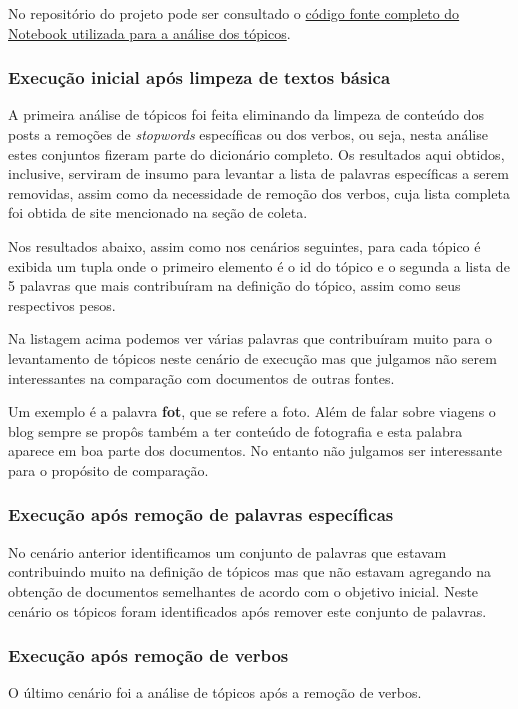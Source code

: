 No repositório do projeto pode ser consultado o \href{https://github.com/heldergr/tcc-pucmg-2/blob/main/src/python/notebooks/nerds-viajantes-lda-analise-topicos.ipynb}{código fonte completo do Notebook utilizada para a análise dos tópicos}.

\subsubsection{Execução inicial após limpeza de textos básica}

A primeira análise de tópicos foi feita eliminando da limpeza de conteúdo dos posts a remoções de \textit{stopwords} específicas ou dos verbos, ou seja,
nesta análise estes conjuntos fizeram parte do dicionário completo. Os resultados aqui obtidos, inclusive, serviram de insumo para levantar a lista
de palavras específicas a serem removidas, assim como da necessidade de remoção dos verbos, cuja lista completa foi obtida de site mencionado na seção de coleta.

Nos resultados abaixo, assim como nos cenários seguintes, para cada tópico é exibida um tupla onde o primeiro elemento é o id do tópico
e o segunda a lista de 5 palavras que mais contribuíram na definição do tópico, assim como seus respectivos pesos.



Na listagem acima podemos ver várias palavras que contribuíram muito para o levantamento de tópicos neste cenário de execução mas que julgamos não serem
interessantes na comparação com documentos de outras fontes.

Um exemplo é a palavra \textbf{fot}, que se refere a foto. Além de falar sobre viagens o blog sempre se propôs também a ter conteúdo de fotografia e esta
palabra aparece em boa parte dos documentos. No entanto não julgamos ser interessante para o propósito de comparação.

\subsubsection{Execução após remoção de palavras específicas}

No cenário anterior identificamos um conjunto de palavras que estavam contribuindo muito na definição de tópicos mas que não estavam agregando na obtenção
de documentos semelhantes de acordo com o objetivo inicial. Neste cenário os tópicos foram identificados após remover este conjunto de palavras.



\subsubsection{Execução após remoção de verbos}

O último cenário foi a análise de tópicos após a remoção de verbos.



